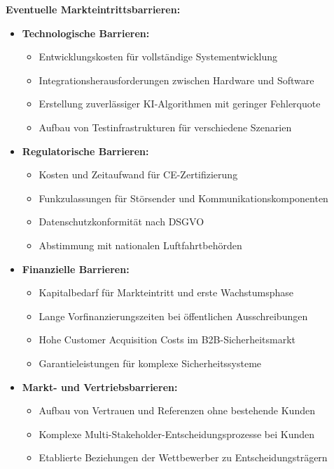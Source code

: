 \documentclass[11pt,a4paper]{article}
\begin{document}
\textbf{Eventuelle Markteintrittsbarrieren:}
\begin{itemize}
\item \textbf{Technologische Barrieren:}
\begin{itemize}
\item Entwicklungskosten für vollständige Systementwicklung
\item Integrationsherausforderungen zwischen Hardware und Software
\item Erstellung zuverlässiger KI-Algorithmen mit geringer Fehlerquote
\item Aufbau von Testinfrastrukturen für verschiedene Szenarien
\end{itemize}

\item \textbf{Regulatorische Barrieren:}
\begin{itemize}
\item Kosten und Zeitaufwand für CE-Zertifizierung
\item Funkzulassungen für Störsender und Kommunikationskomponenten
\item Datenschutzkonformität nach DSGVO
\item Abstimmung mit nationalen Luftfahrtbehörden
\end{itemize}

\item \textbf{Finanzielle Barrieren:}
\begin{itemize}
\item Kapitalbedarf für Markteintritt und erste Wachstumsphase
\item Lange Vorfinanzierungszeiten bei öffentlichen Ausschreibungen
\item Hohe Customer Acquisition Costs im B2B-Sicherheitsmarkt
\item Garantieleistungen für komplexe Sicherheitssysteme
\end{itemize}

\item \textbf{Markt- und Vertriebsbarrieren:}
\begin{itemize}
\item Aufbau von Vertrauen und Referenzen ohne bestehende Kunden
\item Komplexe Multi-Stakeholder-Entscheidungsprozesse bei Kunden
\item Etablierte Beziehungen der Wettbewerber zu Entscheidungsträgern
\end{itemize}
\end{itemize}
\end{document}
